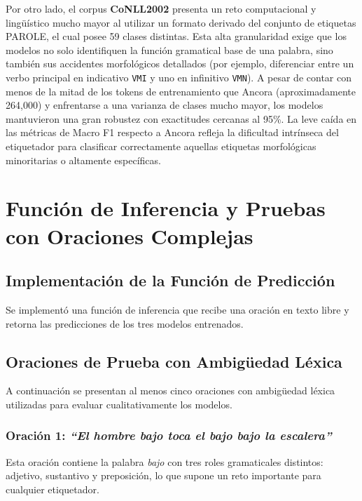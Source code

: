 \documentclass[12pt, a4paper]{article}
\begin{document}
Por otro lado, el corpus \textbf{CoNLL2002} presenta un reto computacional y lingüístico mucho mayor al utilizar un formato derivado del conjunto de etiquetas PAROLE, el cual posee 59 clases distintas. Esta alta granularidad exige que los modelos no solo identifiquen la función gramatical base de una palabra, sino también sus accidentes morfológicos detallados (por ejemplo, diferenciar entre un verbo principal en indicativo \texttt{VMI} y uno en infinitivo \texttt{VMN}). A pesar de contar con menos de la mitad de los tokens de entrenamiento que Ancora (aproximadamente 264,000) y enfrentarse a una varianza de clases mucho mayor, los modelos mantuvieron una gran robustez con exactitudes cercanas al 95\%. La leve caída en las métricas de Macro F1 respecto a Ancora refleja la dificultad intrínseca del etiquetador para clasificar correctamente aquellas etiquetas morfológicas minoritarias o altamente específicas.


\section{Función de Inferencia y Pruebas con Oraciones Complejas}

\subsection{Implementación de la Función de Predicción}

Se implementó una función de inferencia que recibe una oración en texto libre y
retorna las predicciones de los tres modelos entrenados.

\subsection{Oraciones de Prueba con Ambigüedad Léxica}

A continuación se presentan al menos cinco oraciones con ambigüedad léxica
utilizadas para evaluar cualitativamente los modelos.

\subsubsection{Oración 1: \textit{``El hombre bajo toca el bajo bajo la escalera''}}

Esta oración contiene la palabra \textit{bajo} con tres roles gramaticales
distintos: adjetivo, sustantivo y preposición, lo que supone un reto importante
para cualquier etiquetador.
\end{document}
